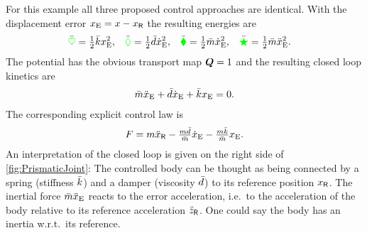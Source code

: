 For this example all three proposed control approaches are identical.
With the displacement error $x_{\mathrm{E}} = x - x_{\mathsf{R}}$ the resulting energies are
\begin{align}
 \bar{\textcolor{green}{\heartsuit}} &= \tfrac{1}{2} \bar{k} x_{\mathrm{E}}^2,&
 \bar{\textcolor{green}{\Diamond}} &= \tfrac{1}{2} \bar{d} \dot{x}_{\mathrm{E}}^2,&
 \bar{\textcolor{green}{\blacklozenge}} &= \tfrac{1}{2} \bar{m} \dot{x}_{\mathrm{E}}^2,&
 \bar{\textcolor{green}{\bigstar}} &= \tfrac{1}{2} \bar{m} \ddot{x}_{\mathrm{E}}^2.
\end{align}
The potential has the obvious transport map $\boldsymbol{Q} = 1$ and the resulting closed loop kinetics are
\begin{align}
 \bar{m} \ddot{x}_{\mathrm{E}} + \bar{d} \dot{x}_{\mathrm{E}} + \bar{k} x_{\mathrm{E}} = 0.
\end{align}
The corresponding explicit control law is
\begin{align}
 F = m \ddot{x}_{\mathsf{R}} - \tfrac{m \bar{d}}{\bar{m}} \dot{x}_{\mathrm{E}} - \tfrac{m \bar{k}}{\bar{m}} x_{\mathrm{E}}.
\end{align}
An interpretation of the closed loop is given on the right side of \autoref{fig:PrismaticJoint}:
The controlled body can be thought as being connected by a spring (stiffness $\bar{k}$) and a damper (viscosity $\bar{d}$) to its reference position $x_{\mathsf{R}}$.
The inertial force $\bar{m} \ddot{x}_{\mathrm{E}}$ reacts to the error acceleration, i.e.\ to the acceleration of the body relative to its reference acceleration $\ddot{z}_{\mathsf{R}}$.
One could say the body has an inertia w.r.t.\ its reference.
